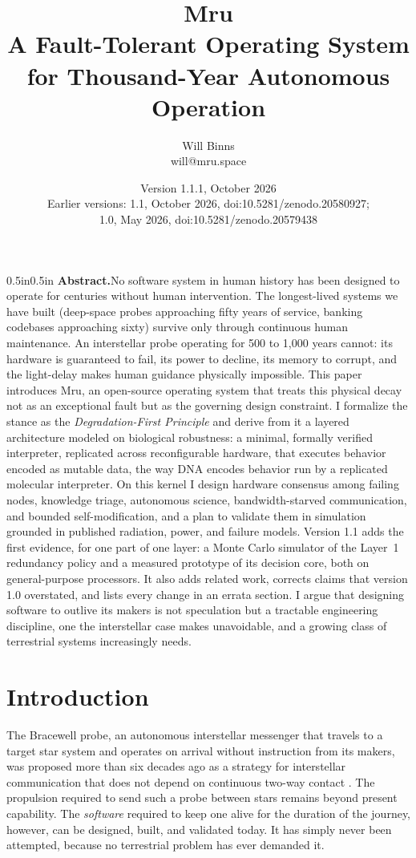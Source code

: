 \documentclass[10pt, a4paper]{article}
\title{Mru\\[0.3cm]
\large A Fault-Tolerant Operating System for Thousand-Year Autonomous Operation}
\author{Will Binns \\ \small will@mru.space}
\date{Version 1.1.1, October 2026\\[2pt] \small Earlier versions: 1.1, October 2026, doi:10.5281/zenodo.20580927;\\ \small 1.0, May 2026, doi:10.5281/zenodo.20579438}
\begin{document}
\maketitle

\begin{adjustwidth}{0.5in}{0.5in}
\noindent\textbf{Abstract.}\quad No software system in human history has been designed to operate for centuries without human intervention. The longest-lived systems we have built (deep-space probes approaching fifty years of service, banking codebases approaching sixty) survive only through continuous human maintenance. An interstellar probe operating for 500 to 1{,}000 years cannot: its hardware is guaranteed to fail, its power to decline, its memory to corrupt, and the light-delay makes human guidance physically impossible. This paper introduces Mru, an open-source operating system that treats this physical decay not as an exceptional fault but as the governing design constraint. I formalize the stance as the \textit{Degradation-First Principle} and derive from it a layered architecture modeled on biological robustness: a minimal, formally verified interpreter, replicated across reconfigurable hardware, that executes behavior encoded as mutable data, the way DNA encodes behavior run by a replicated molecular interpreter. On this kernel I design hardware consensus among failing nodes, knowledge triage, autonomous science, bandwidth-starved communication, and bounded self-modification, and a plan to validate them in simulation grounded in published radiation, power, and failure models. Version 1.1 adds the first evidence, for one part of one layer: a Monte Carlo simulator of the Layer~1 redundancy policy and a measured prototype of its decision core, both on general-purpose processors. It also adds related work, corrects claims that version 1.0 overstated, and lists every change in an errata section. I argue that designing software to outlive its makers is not speculation but a tractable engineering discipline, one the interstellar case makes unavoidable, and a growing class of terrestrial systems increasingly needs.
\end{adjustwidth}

\section{Introduction}

The Bracewell probe, an autonomous interstellar messenger that travels to a target star system and operates on arrival without instruction from its makers, was proposed more than six decades ago as a strategy for interstellar communication that does not depend on continuous two-way contact \cite{bracewell1960}. The propulsion required to send such a probe between stars remains beyond present capability. The \textit{software} required to keep one alive for the duration of the journey, however, can be designed, built, and validated today. It has simply never been attempted, because no terrestrial problem has ever demanded it.
\end{document}
